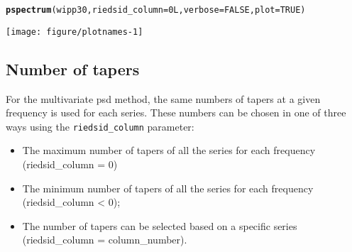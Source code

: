 \documentclass[11pt]{article}\usepackage[]{graphicx}\usepackage[]{color}
\makeatletter
\def\maxwidth{ %
  \ifdim\Gin@nat@width>\linewidth
    \linewidth
  \else
    \Gin@nat@width
  \fi
}
\newcommand{\hlnum}[1]{\textcolor[rgb]{0.686,0.059,0.569}{#1}}%
\newcommand{\hlstd}[1]{\textcolor[rgb]{0.345,0.345,0.345}{#1}}%
\newcommand{\hlkwc}[1]{\textcolor[rgb]{0.333,0.667,0.333}{#1}}%
\newcommand{\hlkwd}[1]{\textcolor[rgb]{0.737,0.353,0.396}{\textbf{#1}}}%
\newenvironment{kframe}{%
 \def\at@end@of@kframe{}%
 \ifinner\ifhmode%
  \def\at@end@of@kframe{\end{minipage}}%
  \begin{minipage}{\columnwidth}%
 \fi\fi%
 \def\FrameCommand##1{\hskip\@totalleftmargin \hskip-\fboxsep
 \colorbox{shadecolor}{##1}\hskip-\fboxsep
     \hskip-\linewidth \hskip-\@totalleftmargin \hskip\columnwidth}%
 \MakeFramed {\advance\hsize-\width
   \@totalleftmargin\z@ \linewidth\hsize
   \@setminipage}}%
 {\par\unskip\endMakeFramed%
 \at@end@of@kframe}
\newenvironment{knitrout}{}{} %
\newcommand{\Rcmd}[1]{\texttt{#1}}
\makeatother
\begin{document}
\begin{knitrout}
\color{fgcolor}\begin{kframe}
\begin{alltt}
\hlkwd{pspectrum}\hlstd{(wipp30,} \hlkwc{riedsid_column}\hlstd{=} \hlnum{0L}\hlstd{,} \hlkwc{verbose} \hlstd{=} \hlnum{FALSE}\hlstd{,} \hlkwc{plot} \hlstd{=} \hlnum{TRUE}\hlstd{)}
\end{alltt}
\end{kframe}
\texttt{[image: figure/plotnames-1]} 

\end{knitrout}




\newpage

\subsection{Number of tapers}

For the multivariate psd method, the same numbers of tapers at a given frequency is used for each series. These numbers can be chosen in one of three ways using the \Rcmd{riedsid\_column} parameter:

\begin{itemize}
\item The maximum number of tapers of all the series for each frequency (riedsid\_column = 0)
\item The minimum number of tapers of all the series for each frequency (riedsid\_column < 0);
\item The number of tapers can be selected based on a specific series (riedsid\_column = column\_number).
\end{itemize}
\end{document}
